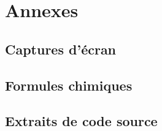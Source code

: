 \appendix
\chapter{Annexes}

\section{Captures d'écran}

\section{Formules chimiques}

\section{Extraits de code source}
